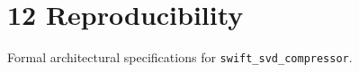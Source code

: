 \section{12 Reproducibility}

Formal architectural specifications for \texttt{swift_svd_compressor}.
